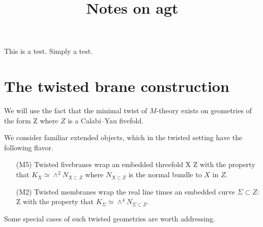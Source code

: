 \documentclass[11pt]{amsart}
\begin{document}
\title{Notes on agt}
\maketitle


This is a test. Simply a test.

\section{The twisted brane construction}

We will use the fact that the minimal twist of $M$-theory exists on geometries of the form
\beqn
Z \times \R
\eeqn
where $Z$ is a Calabi--Yau fivefold.

We consider familiar extended objects, which in the twisted setting have the following flavor.
\begin{itemize}
\item[(M5)] Twisted fivebranes wrap an embedded threefold
\beqn
X \subset Z
\eeqn
with the property that $K_X \simeq \wedge^2 N_{X \subset Z}$ where $N_{X \subset Z}$ is the normal bundle to $X$ in $Z$.
\item[(M2)] Twisted membranes wrap the real line times an embedded curve $\Sigma \subset Z$:
\beqn
\Sigma \times \R \subset Z \times \R
\eeqn
with the property that $K_\Sigma \simeq \wedge^4 N_{\Sigma \subset Z}$.
\end{itemize}



Some special cases of such twisted geometries are worth addressing.
\end{document}
